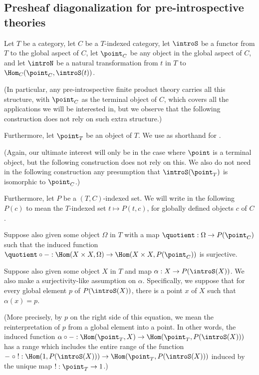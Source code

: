 \subsection{Presheaf diagonalization for pre-introspective theories}
\label{PreIntrospDiag}
Let $T$ be a category, let $C$ be a $T$-indexed category, let $\introS$ be a functor from $T$ to the global aspect of $C$, let $\point_C$ be any object in the global aspect of $C$, and let $\introN$ be a natural transformation from $t$ in $T$ to $\Hom_C(\point_C, \introS(t))$.

(In particular, any pre-introspective finite product theory carries all this structure, with $\point_C$ as the terminal object of $C$, which covers all the applications we will be interested in, but we observe that the following construction does not rely on such extra structure.)

Furthermore, let $\point_T$ be an object of $T$. We use  as shorthand for .

(Again, our ultimate interest will only be in the case where $\point$ is a terminal object, but the following construction does not rely on this. We also do not need in the following construction any presumption that $\introS(\point_T)$ is isomorphic to $\point_C$.)

Furthermore, let $P$ be a $(T, C)$-indexed set. We will write in the following $P(c)$ to mean the $T$-indexed set $t \mapsto P(t, c)$, for globally defined objects $c$ of $C$.

Suppose also given some object $\Omega$ in $T$ with a map $\quotient : \Omega \to P(\point_C)$ such that the induced function $\quotient \circ - : \Hom(X \times X, \Omega) \to \Hom(X \times X, P(\point_C))$ is surjective.

Suppose also given some object $X$ in $T$ and map $\alpha : X \to P(\introS(X))$. We also make a surjectivity-like assumption on $\alpha$. Specifically, we suppose that for every global element $p$ of $P(\introS(X))$, there is a point $x$ of $X$ such that $\alpha(x) = p$.

(More precisely, by $p$ on the right side of this equation, we mean the reinterpretation of $p$ from a global element into a point. In other words, the induced function $\alpha \circ - : \Hom(\point_T, X) \to \Hom(\point_T, P(\introS(X)))$ has a range which includes the entire range of the function $- \; \circ \; ! : \Hom(1, P(\introS(X))) \to \Hom(\point_T, P(\introS(X)))$ induced by the unique map $! : \point_T \to 1$.)

